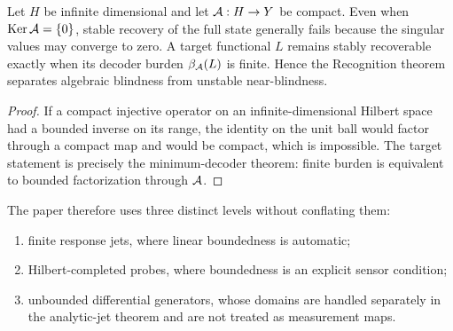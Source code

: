 \begin{proposition}
Let $H$ be infinite dimensional and let $\mathcal A:H\to Y$ be compact.  Even when $\operatorname{Ker}\mathcal A=\{0\}$, stable recovery of the full state generally fails because the singular values may converge to zero.  A target functional $L$ remains stably recoverable exactly when its decoder burden $\beta_\mathcal A(L)$ is finite.  Hence the Recognition theorem separates algebraic blindness from unstable near-blindness.
\end{proposition}

\begin{proof}
If a compact injective operator on an infinite-dimensional Hilbert space had a bounded inverse on its range, the identity on the unit ball would factor through a compact map and would be compact, which is impossible.  The target statement is precisely the minimum-decoder theorem: finite burden is equivalent to bounded factorization through $\mathcal A$.
\end{proof}

\begin{remark}
The paper therefore uses three distinct levels without conflating them:
\begin{enumerate}[label=(\roman*)]
\item finite response jets, where linear boundedness is automatic;
\item Hilbert-completed probes, where boundedness is an explicit sensor condition;
\item unbounded differential generators, whose domains are handled separately in the analytic-jet theorem and are not treated as measurement maps.
\end{enumerate}
\end{remark}
